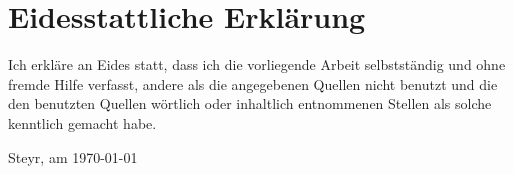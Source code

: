 \section*{Eidesstattliche Erklärung} %
\label{sec:eidessterkl}

Ich erkläre an Eides statt, dass ich die vorliegende Arbeit selbstständig und ohne fremde Hilfe verfasst, andere als die angegebenen Quellen nicht benutzt und die den benutzten Quellen wörtlich oder inhaltlich entnommenen Stellen als solche kenntlich gemacht habe.

\vspace*{2cm}

\begin{flushright}
 Steyr, am \today
\end{flushright}